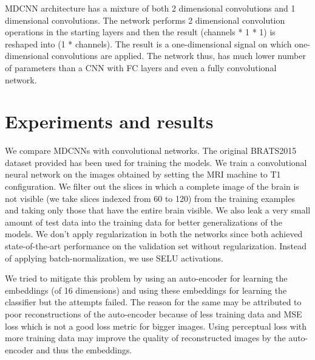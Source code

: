 \documentclass[journal]{IEEEtran}
\begin{document}
MDCNN architecture has a mixture of both 2 dimensional convolutions and 1 dimensional convolutions. The network performs 2 dimensional convolution operations in the starting layers and then the result (channels * 1 * 1) is reshaped into (1 * channels). The result is a one-dimensional signal on which one-dimensional convolutions are applied. The network thus, has much lower number of parameters than a CNN with FC layers and even a fully convolutional network.

\section{Experiments and results}
We compare MDCNNs with convolutional networks. The original BRATS2015 dataset provided has been used for training the models. We train a convolutional neural network on the images obtained by setting the MRI machine to T1 configuration. We filter out the slices in which a complete image of the brain is not visible (we take slices indexed from 60 to 120) from the training examples and taking only those that have the entire brain visible. We also leak a very small amount of test data into the training data for better generalizations of the models. We don't apply regularization in both the networks since both achieved state-of-the-art performance on the validation set without regularization. Instead of applying batch-normalization, we use SELU activations.\cite{SNN}

We tried to mitigate this problem by using an auto-encoder for learning the embeddings (of 16 dimensions) and using these embeddings for learning the classifier but the attempts failed. The reason for the same may be attributed to poor reconstructions of the auto-encoder because of less training data and MSE loss which is not a good loss metric for bigger images. Using perceptual loss with more training data may improve the quality of reconstructed images by the auto-encoder and thus the embeddings.
\end{document}
